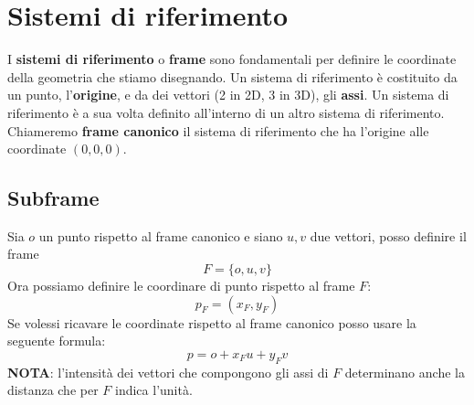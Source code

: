 \section{Sistemi di riferimento}
I \textbf{sistemi di riferimento} o \textbf{frame} sono fondamentali per definire le coordinate
della geometria che stiamo disegnando. Un sistema di riferimento \`e costituito da un punto,
l'\textbf{origine}, e da dei vettori (2 in 2D, 3 in 3D), gli \textbf{assi}.
Un sistema di riferimento \`e a sua volta definito all'interno di un altro sistema di
riferimento. Chiameremo \textbf{frame canonico} il sistema di riferimento che
ha l'origine alle coordinate $(0, 0, 0)$.

\subsection{Subframe}
Sia $o$ un punto rispetto al frame canonico e siano $u, v$ due vettori, posso definire il frame
\[ F = \{ o, u, v \} \]
Ora possiamo definire le coordinare di punto rispetto al frame $F$:
\[ p_F = (x_F, y_F) \]
Se volessi ricavare le coordinate rispetto al frame canonico posso usare la seguente formula:
\[ p = o + x_Fu + y_Fv \]
\textbf{NOTA}: l'intensit\`a dei vettori che compongono gli assi di $F$ determinano anche
la distanza che per $F$ indica l'unit\`a.

